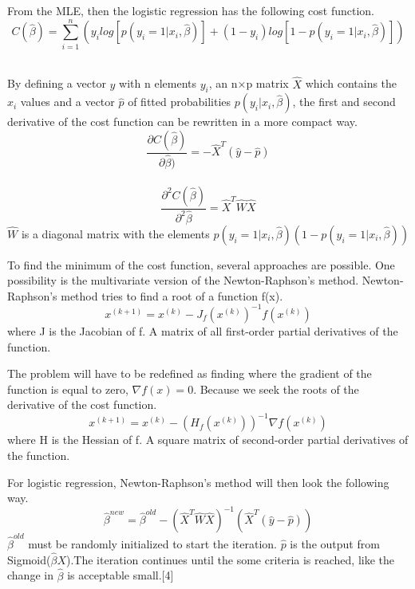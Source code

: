 From the MLE, then the logistic regression has the following cost function. 
\begin{equation}
C(\hat{\beta})=\sum_{i=1}^{n}(y_i log[p(y_i=1\vert x_i,\hat{\beta})]
+(1-y_i)log[1-p(y_i=1\vert x_i,\hat{\beta})])
\end{equation}
\\
\par
By defining a vector $\hat{y}$ with n elements $y_i$, an n×p matrix $\hat{X}$ which contains the $x_i$ values and a vector $\hat{p}$ of fitted probabilities $p(y_i \vert x_i,\hat{\beta})$, the first and second derivative of the cost function can be rewritten in a more compact way. 
\begin{equation}
\frac{\partial C(\hat{\beta})}{\partial\hat{\beta})}=-\hat{X}^T(\hat{y}-\hat{p})
\end{equation}
\\
\begin{equation}
\frac{\partial^2 C(\hat{\beta})}{\partial^2\hat{\beta}}=\hat{X}^T\hat{W}\hat{X}
\end{equation}
$\hat{W}$ is a diagonal matrix with the elements $p(y_i=1\vert x_i,\hat{\beta})
(1-p(y_i=1\vert x_i,\hat{\beta}))$
\\
\par

To find the minimum of the cost function, several approaches are possible. One possibility is the multivariate version of the Newton-Raphson's method. Newton-Raphson's method tries to find a root of a function f(x). 
\begin{equation}
x^{(k+1)}=x^{(k)}-J_f(x^{(k)})^{-1}f(x^{(k)}) 
\end{equation}
where J is the Jacobian of f. A matrix of all first-order partial derivatives of the function.
\\
\par

The problem will have to be redefined as finding where the gradient of the function is equal to zero, $\nabla f(x)=0$. Because we seek the roots of the derivative of the cost function.
\begin{equation}
x^{(k+1)}=x^{(k)}-(H_f(x^{(k)}))^{-1}\nabla f(x^{(k)}) 
\end{equation}
where H is the Hessian of f. A square matrix of second-order partial derivatives of the function.
\\
\par
For logistic regression, Newton-Raphson's method will then look the following way. 
\begin{equation}
\hat{\beta}^{new}=\hat{\beta}^{old}-(\hat{X}^T\hat{W}\hat{X})^{-1}
(\hat{X}^T(\hat{y}-\hat{p}))
\end{equation}
$\hat{\beta}^{old}$ must be randomly initialized to start the iteration. $\hat{p}$ is the output from Sigmoid($\hat{\beta}X$).The iteration continues until the some criteria is reached, like the change in $\hat{\beta}$ is acceptable small.[4]   
\\
\par

